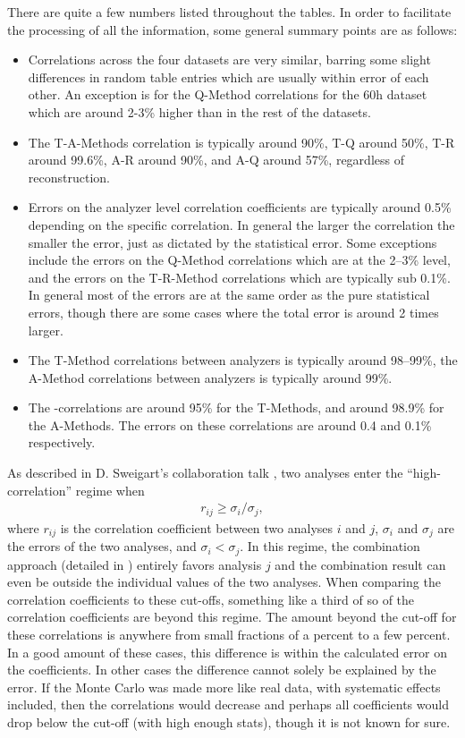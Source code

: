 There are quite a few numbers listed throughout the tables. In order to facilitate the processing of all the information, some general summary points are as follows: 
\begin{itemize}
	\item{Correlations across the four datasets are very similar, barring some slight differences in random table entries which are usually within error of each other. An exception is for the Q-Method correlations for the 60h dataset which are around 2-3\% higher than in the rest of the datasets.}
	\item{The T-A-Methods correlation is typically around 90\%, T-Q around 50\%, T-R around 99.6\%, A-R around 90\%, and A-Q around 57\%, regardless of reconstruction.}
	\item{Errors on the analyzer level correlation coefficients are typically around 0.5\% depending on the specific correlation. In general the larger the correlation the smaller the error, just as dictated by the statistical error. Some exceptions include the errors on the Q-Method correlations which are at the 2--3\% level, and the errors on the T-R-Method correlations which are typically sub 0.1\%. In general most of the errors are at the same order as the pure statistical errors, though there are some cases where the total error is around 2 times larger.}
	\item{The T-Method correlations between \RW analyzers is typically around 98--99\%, the A-Method correlations between \RW analyzers is typically around 99\%.}
	\item{The \RE-\RW correlations are around 95\% for the T-Methods, and around 98.9\% for the A-Methods. The errors on these correlations are around 0.4 and 0.1\% respectively.}
\end{itemize}


As described in D. Sweigart's collaboration talk \cite{DavidCollabTalk}, two analyses enter the ``high-correlation'' regime when 
\begin{align}
	r_{ij} \geq \sigma_{i}/\sigma_{j},
\end{align}
where $r_{ij}$ is the correlation coefficient between two analyses $i$ and $j$, $\sigma_{i}$ and $\sigma_{j}$ are the errors of the two analyses, and $\sigma_{i} < \sigma_{j}$. In this regime, the \chisq combination approach (detailed in ) entirely favors analysis $j$ and the combination result can even be outside the individual values of the two analyses. When comparing the correlation coefficients to these cut-offs, something like a third of so of the correlation coefficients are beyond this regime. The amount beyond the cut-off for these correlations is anywhere from small fractions of a percent to a few percent. In a good amount of these cases, this difference is within the calculated error on the coefficients. In other cases the difference cannot solely be explained by the error. If the Monte Carlo was made more like real data, with systematic effects included, then the correlations would decrease and perhaps all coefficients would drop below the cut-off (with high enough stats), though it is not known for sure.



